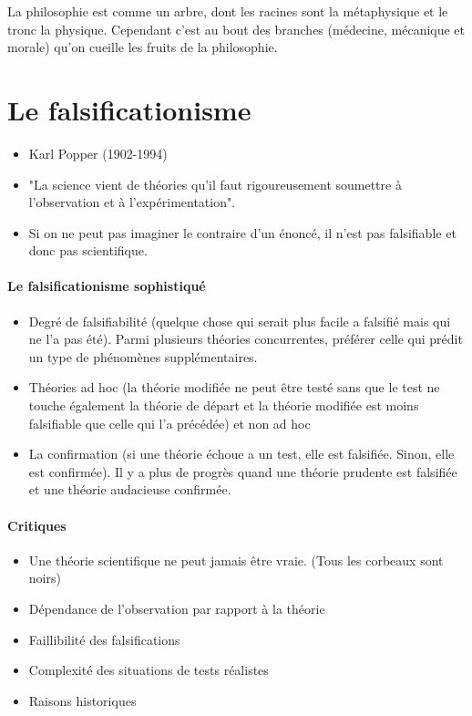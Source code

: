 \documentclass[fleqn,letterpaper, 12pt]{article}
\begin{document}
	La philosophie est comme un arbre, dont les racines sont la métaphysique et le tronc la physique. Cependant c'est au bout des branches (médecine, mécanique et morale) qu'on cueille les fruits de la philosophie.
	
	
	\section{Le falsificationisme}
	
	\begin{itemize}
		\item Karl Popper (1902-1994)
		\item "La science vient de théories qu'il faut rigoureusement soumettre à l'observation et à l'expérimentation".
		\item Si on ne peut pas imaginer le contraire d'un énoncé, il n'est pas falsifiable et donc pas scientifique.
	\end{itemize}
	
	\paragraph{Le falsificationisme sophistiqué}
	\begin{itemize}
		\item Degré de falsifiabilité (quelque chose qui serait plus facile a falsifié mais qui ne l'a pas été). Parmi plusieurs théories concurrentes, préférer celle qui prédit un type de phénomènes supplémentaires.
		\item Théories ad hoc (la théorie modifiée ne peut être testé sans que le test ne touche également la théorie de départ et la théorie modifiée est moins falsifiable que celle qui l'a précédée) et non ad hoc 
		\item La confirmation (si une théorie échoue a un test, elle est falsifiée. Sinon, elle est confirmée). Il y a plus de progrès quand une théorie prudente est falsifiée et une théorie audacieuse confirmée.
	\end{itemize}
	
	\paragraph{Critiques}
	\begin{itemize}
		\item Une théorie scientifique ne peut jamais être vraie. (Tous les corbeaux sont noirs)
		\item Dépendance de l'observation par rapport à la théorie
		\item Faillibilité des falsifications
		\item Complexité des situations de tests réalistes
		\item Raisons historiques
	\end{itemize}
	
\end{document}
